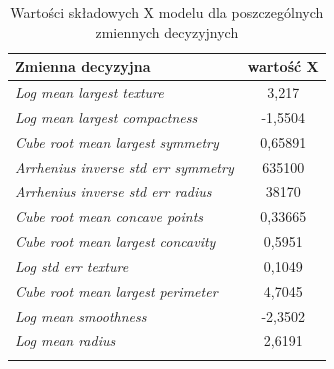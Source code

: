 \begin{longtable}{l | c}
	\centering
	Zmienna decyzyjna & wartość X \\
	\hline
	\textit{Log mean largest texture} & 3,217 \\
	\textit{Log mean largest compactness} & -1,5504 \\
	\textit{Cube root mean largest symmetry} & 0,65891 \\
	\textit{Arrhenius inverse std err symmetry} & 635100 \\
	\textit{Arrhenius inverse std err radius} & 38170 \\
	\textit{Cube root mean concave points} & 0,33665 \\
	\textit{Cube root mean largest concavity} & 0,5951 \\
	\textit{Log std err texture} & 0,1049 \\
	\textit{Cube root mean largest perimeter} & 4,7045 \\
	\textit{Log mean smoothness} & -2,3502 \\
	\textit{Log mean radius} & 2,6191 \\
	\caption{Wartości składowych X modelu dla poszczególnych zmiennych decyzyjnych}
	\label{svm:1}
\end{longtable} 

